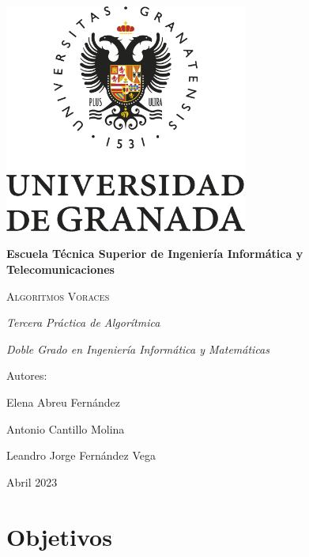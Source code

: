 \documentclass[a4paper,12pt,twoside]{article} %
\begin{document}
\begin{titlepage}
\centering

{\includegraphics[width=0.6\textwidth]{foto_portada.png}\par}
\vspace{1cm}

{\bfseries\LARGE Escuela Técnica Superior de Ingeniería Informática y Telecomunicaciones \par}
\vspace{0.4cm}

{\scshape\Huge Algoritmos Voraces \par}
\vspace{0.4cm}

{\itshape\Large Tercera Práctica de Algorítmica \par}
\vspace{0.5cm}

{\itshape\Large Doble Grado en Ingeniería Informática y Matemáticas \par}
\vspace{0.4cm}

{\Large Autores: \par}
{\Large Elena Abreu Fernández \par}
{\Large Antonio Cantillo Molina \par}
{\Large Leandro Jorge Fernández Vega \par}
\vfill

{\Large Abril 2023 \par}

\end{titlepage}

\tableofcontents
\newpage


\section{Objetivos}
\end{document}
